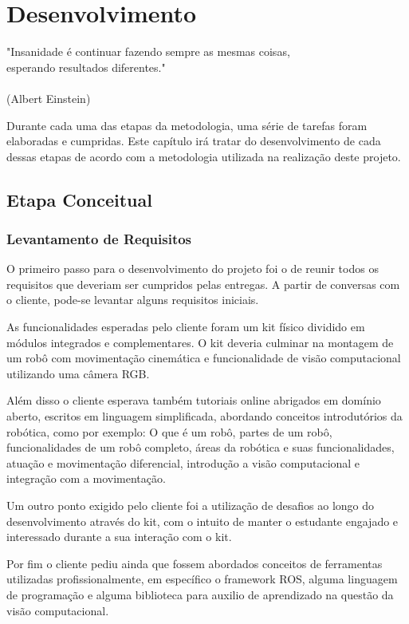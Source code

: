 \chapter{Desenvolvimento}
\label{chap:desen_test}
\begin{flushright}
	"Insanidade é continuar fazendo sempre as mesmas coisas, \\ 
	esperando resultados diferentes." \\
	\ \\
	(Albert Einstein)
\end{flushright}

Durante cada uma das etapas da metodologia, uma série de tarefas foram elaboradas e cumpridas. Este capítulo irá tratar do desenvolvimento de cada dessas etapas de acordo com a metodologia utilizada na realização deste projeto.

\section{Etapa Conceitual}
\subsection{Levantamento de Requisitos}
O primeiro passo para o desenvolvimento do projeto foi o de reunir todos os requisitos que deveriam ser cumpridos pelas entregas. A partir de conversas com o cliente, pode-se levantar alguns requisitos iniciais.

As funcionalidades esperadas pelo cliente foram um kit físico dividido em módulos integrados e complementares. O kit deveria culminar na montagem de um robô com movimentação cinemática e funcionalidade de visão computacional utilizando uma câmera RGB.
 
Além disso o cliente esperava também tutoriais online abrigados em domínio aberto, escritos em linguagem simplificada, abordando conceitos introdutórios da robótica, como por exemplo: O que é um robô, partes de um robô, funcionalidades de um robô completo, áreas da robótica e suas funcionalidades, atuação e movimentação diferencial, introdução a visão computacional e integração com a movimentação.

Um outro ponto exigido pelo cliente foi a utilização de desafios ao longo do desenvolvimento através do kit, com o intuito de manter o estudante engajado e interessado durante a sua interação com o kit.

Por fim o cliente pediu ainda que fossem abordados conceitos de ferramentas utilizadas profissionalmente, em específico o framework ROS, alguma linguagem de programação e alguma biblioteca para auxilio de aprendizado na questão da visão computacional.

